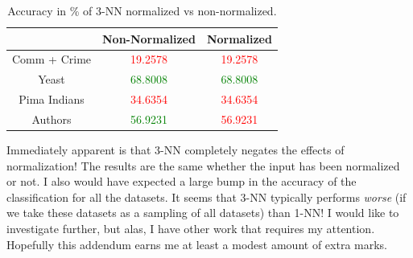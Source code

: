 \documentclass[a4paper,10pt]{article}
\begin{document}
    \begin{table}[hc]
      \centering
      \caption{Accuracy in \% of 3-NN  normalized vs non-normalized.} 
      \begin{tabular}{|c|c|c|}
        \hline
                      & \textbf{Non-Normalized} & \textbf{Normalized} \\ \hline
        Comm + Crime  &   \textcolor{red}{19.2578}        &  \textcolor{red}{19.2578}    \\
        Yeast         &   \textcolor{green}{68.8008}      &  \textcolor{green}{68.8008}    \\
        Pima Indians  &   \textcolor{red}{34.6354}        &  \textcolor{red}{34.6354}    \\
        Authors       &   \textcolor{green}{56.9231}      &   \textcolor{red}{56.9231}    \\
        \hline
      \end{tabular}
    \end{table}
    Immediately apparent is that 3-NN completely negates the effects of normalization! The results are the same
    whether the input has been normalized or not. I also would have expected a large bump in the accuracy of the 
    classification for all the datasets. It seems that 3-NN typically performs \emph{worse} (if we take these datasets as a
    sampling of all datasets) than 1-NN! I would like to investigate further, but alas, I have other work that requires my
    attention. Hopefully this addendum earns me at least a modest amount of extra marks.
\end{document}
